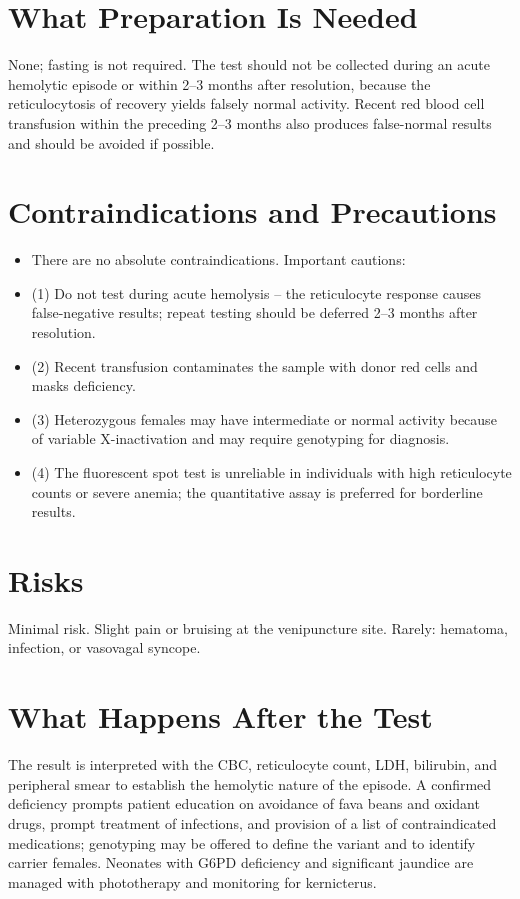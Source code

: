 \section*{What Preparation Is Needed}
None; fasting is not required. The test should not be collected during an acute hemolytic episode or within 2--3 months after resolution, because the reticulocytosis of recovery yields falsely normal activity. Recent red blood cell transfusion within the preceding 2--3 months also produces false-normal results and should be avoided if possible.
\section*{Contraindications and Precautions}
\begin{itemize}
  \item There are no absolute contraindications. Important cautions:
  \item (1) Do not test during acute hemolysis -- the reticulocyte response causes false-negative results; repeat testing should be deferred 2--3 months after resolution.
  \item (2) Recent transfusion contaminates the sample with donor red cells and masks deficiency.
  \item (3) Heterozygous females may have intermediate or normal activity because of variable X-inactivation and may require genotyping for diagnosis.
  \item (4) The fluorescent spot test is unreliable in individuals with high reticulocyte counts or severe anemia; the quantitative assay is preferred for borderline results.
\end{itemize}
\section*{Risks}
Minimal risk. Slight pain or bruising at the venipuncture site. Rarely: hematoma, infection, or vasovagal syncope.
\section*{What Happens After the Test}
The result is interpreted with the CBC, reticulocyte count, LDH, bilirubin, and peripheral smear to establish the hemolytic nature of the episode. A confirmed deficiency prompts patient education on avoidance of fava beans and oxidant drugs, prompt treatment of infections, and provision of a list of contraindicated medications; genotyping may be offered to define the variant and to identify carrier females. Neonates with G6PD deficiency and significant jaundice are managed with phototherapy and monitoring for kernicterus.
